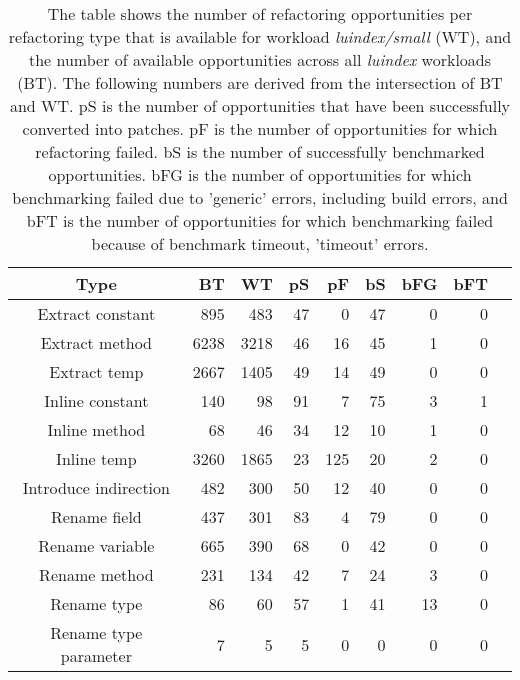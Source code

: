 \begin{table}[!h]
\caption{The table shows the number of refactoring opportunities per refactoring type that is available for workload \textit{luindex/small} (WT), and the number of available opportunities across all \textit{luindex} workloads (BT). The following numbers are derived from the intersection of BT and WT. pS is the number of opportunities that have been successfully converted into patches. pF is the number of opportunities for which refactoring failed. bS is the number of successfully benchmarked opportunities. bFG is the number of opportunities for which benchmarking failed due to 'generic' errors, including build errors, and bFT is the number of opportunities for which benchmarking failed because of benchmark timeout, 'timeout' errors.}
\begin{tabular}{c|*{7}{r}r}
Type&BT&WT&pS&pF&bS&bFG&bFT\\
\hline
Extract constant&895&483&47&0&47&0&0\\
Extract method&6238&3218&46&16&45&1&0\\
Extract temp&2667&1405&49&14&49&0&0\\
Inline constant&140&98&91&7&75&3&1\\
Inline method&68&46&34&12&10&1&0\\
Inline temp&3260&1865&23&125&20&2&0\\
Introduce indirection&482&300&50&12&40&0&0\\
Rename field&437&301&83&4&79&0&0\\
Rename variable&665&390&68&0&42&0&0\\
Rename method&231&134&42&7&24&3&0\\
Rename type&86&60&57&1&41&13&0\\
Rename type parameter&7&5&5&0&0&0&0\\
\end{tabular}
\end{table}
